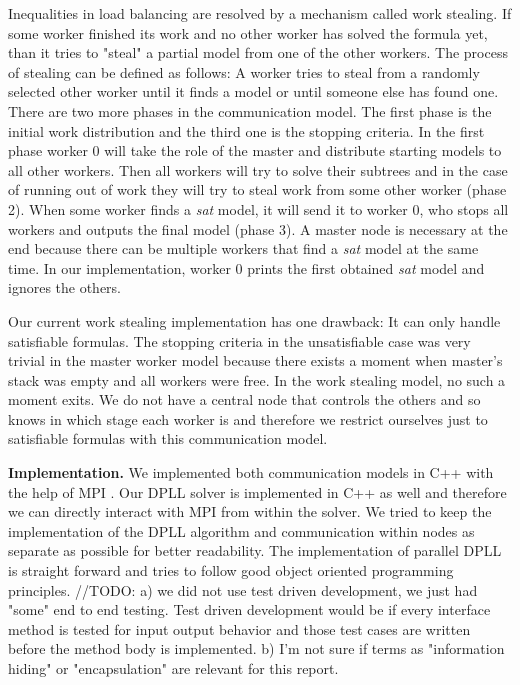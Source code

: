 \documentclass[letterpaper]{article}
\newcommand{\mypar}[1]{{\bf #1.}}
\begin{document}
Inequalities in load balancing are resolved by a mechanism called work stealing.
If some worker finished its work and no other worker has solved the formula yet, than it tries to "steal" a partial model from one of the other workers.
The process of stealing can be defined as follows:
A worker tries to steal from a randomly selected other worker until it finds a model or until someone else has found one.
There are two more phases in the communication model.
The first phase is the initial work distribution and the third one is the stopping criteria.
In the first phase worker 0 will take the role of the master and distribute starting models to all other workers.
Then all workers will try to solve their subtrees and in the case of running out of work they will try to steal work from some other worker (phase 2).
When some worker finds a \textit{sat} model, it will send it to worker 0, who stops all workers and outputs the final model (phase 3).
A master node is necessary at the end because there can be multiple workers that find a \textit{sat} model at the same time.
In our implementation, worker 0 prints the first obtained \textit{sat} model and ignores the others.

Our current work stealing implementation has one drawback:
It can only handle satisfiable formulas.
The stopping criteria in the unsatisfiable case was very trivial in the master worker model because there exists a moment when master's stack was empty and all workers were free.
In the work stealing model, no such a moment exits.
We do not have a central node that controls the others and so knows in which stage each worker is and therefore we restrict ourselves just to satisfiable formulas with this communication model.

\mypar{Implementation}
We implemented both communication models in C++ with the help of MPI \cite{mpi}.
Our DPLL solver is implemented in C++ as well and therefore we can directly interact with MPI from within the solver.
We tried to keep the implementation of the DPLL algorithm and communication within nodes as separate as possible for better readability.
The implementation of parallel DPLL is straight forward and tries to follow good object oriented programming principles.
\iffalse
//TODO:
a) we did not use test driven development, we just had "some" end to end testing.
Test driven development would be if every interface method is tested for input output behavior and those test cases are written before the method body is implemented.
b) I'm not sure if terms as "information hiding" or "encapsulation" are relevant for this report.
\end{document}
